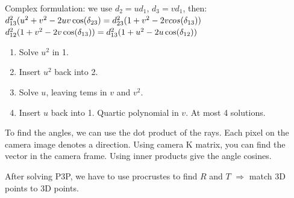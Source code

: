 Complex formulation: we use $d_2 = u d_1$, $d_3 = v d_1$, then:\\
$d_{13}^2 (u^2 + v^2 - 2 u v \cos(\delta_{23}) \\= 
d_{23}^2(1+v^2 - 2 v cos(\delta_{13}))$\\
$d_{12}^2 (1 + v^2 - 2v \cos(\delta_{13})) \\=
d_{13}^2 (1 + u^2 - 2u \cos(\delta_{12}))$
\begin{enumerate}
  \item Solve $u^2$ in 1.
  \item Insert $u^2$ back into 2.
  \item Solve $u$, leaving tems in $v$ and $v^2$.
  \item Insert $u$ back into 1. Quartic polynomial in $v$.
    \alert{At most 4 solutions}.
\end{enumerate}
\alert{To find the angles, we can use the dot product of the rays.}
Each pixel on the camera image denotes a direction. Using camera K matrix, you can find the vector in the camera frame. Using inner products give the angle cosines.

After solving P3P, we have to use procrustes to find $R$ and $T$
$\Rightarrow$ match 3D points to 3D points.
